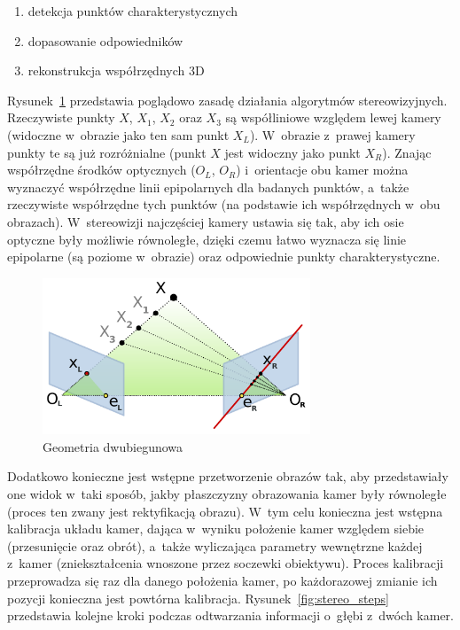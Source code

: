 \begin{enumerate}
\item detekcja punktów charakterystycznych
\item dopasowanie odpowiedników
\item rekonstrukcja współrzędnych 3D
\end{enumerate}

Rysunek~\ref{fig:epipolar} przedstawia poglądowo zasadę działania algorytmów
stereowizyjnych. Rzeczywiste punkty $X$, $X_1$, $X_2$ oraz $X_3$ są współliniowe
względem lewej kamery (widoczne w~obrazie jako ten sam punkt $X_L$). W~obrazie 
z~prawej kamery punkty te są już rozróżnialne (punkt $X$ jest widoczny jako punkt
$X_R$). Znając współrzędne środków optycznych ($O_L$, $O_R$) i~orientacje obu
kamer można wyznaczyć współrzędne linii epipolarnych dla badanych punktów, 
a~także rzeczywiste współrzędne tych punktów (na podstawie ich współrzędnych 
w~obu obrazach). W~stereowizji najczęściej kamery ustawia się tak, aby ich osie
optyczne były możliwie równoległe, dzięki czemu łatwo wyznacza się linie
epipolarne (są poziome w~obrazie) oraz odpowiednie punkty charakterystyczne.

\begin{figure}[h!]
\centering
\includegraphics[width=8cm]{../../Common/img/Epipolar_geometry}
\caption{Geometria dwubiegunowa}
\label{fig:epipolar}
\end{figure}

Dodatkowo konieczne jest wstępne przetworzenie obrazów tak, aby przedstawiały
one widok w~taki sposób, jakby płaszczyzny obrazowania kamer były równoległe
(proces ten zwany jest rektyfikacją obrazu). W~tym celu konieczna jest wstępna
kalibracja układu kamer, dająca w~wyniku położenie kamer względem siebie
(przesunięcie oraz obrót), a~także wyliczająca parametry wewnętrzne każdej 
z~kamer (zniekształcenia wnoszone przez soczewki obiektywu). Proces kalibracji
przeprowadza się raz dla danego położenia kamer, po każdorazowej zmianie ich
pozycji konieczna jest powtórna kalibracja. Rysunek~\ref{fig:stereo_steps}
przedstawia kolejne kroki podczas odtwarzania informacji o~głębi z~dwóch kamer.


